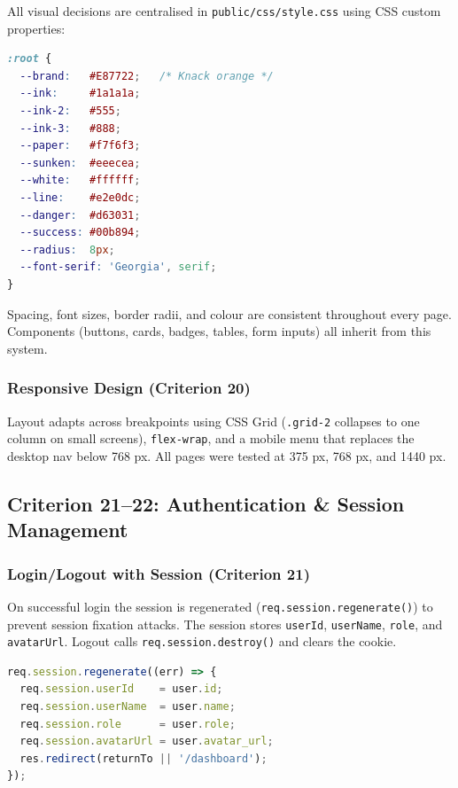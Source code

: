 \documentclass[12pt,a4paper]{article}
\begin{document}
All visual decisions are centralised in \texttt{public/css/style.css} using CSS custom properties:

\begin{lstlisting}[language=CSS, caption={CSS design token excerpt}]
:root {
  --brand:   #E87722;   /* Knack orange */
  --ink:     #1a1a1a;
  --ink-2:   #555;
  --ink-3:   #888;
  --paper:   #f7f6f3;
  --sunken:  #eeecea;
  --white:   #ffffff;
  --line:    #e2e0dc;
  --danger:  #d63031;
  --success: #00b894;
  --radius:  8px;
  --font-serif: 'Georgia', serif;
}
\end{lstlisting}

Spacing, font sizes, border radii, and colour are consistent throughout every page. Components (buttons, cards, badges, tables, form inputs) all inherit from this system.

\subsubsection{Responsive Design (Criterion 20)}

Layout adapts across breakpoints using CSS Grid (\texttt{.grid-2} collapses to one column on small screens), \texttt{flex-wrap}, and a mobile menu that replaces the desktop nav below 768 px. All pages were tested at 375 px, 768 px, and 1440 px.

\subsection{Criterion 21--22: Authentication \& Session Management}

\subsubsection{Login/Logout with Session (Criterion 21)}

On successful login the session is regenerated (\texttt{req.session.regenerate()}) to prevent session fixation attacks. The session stores \texttt{userId}, \texttt{userName}, \texttt{role}, and \texttt{avatarUrl}. Logout calls \texttt{req.session.destroy()} and clears the cookie.

\begin{lstlisting}[language=JavaScript, caption={Session creation on login}]
req.session.regenerate((err) => {
  req.session.userId    = user.id;
  req.session.userName  = user.name;
  req.session.role      = user.role;
  req.session.avatarUrl = user.avatar_url;
  res.redirect(returnTo || '/dashboard');
});
\end{lstlisting}
\end{document}
